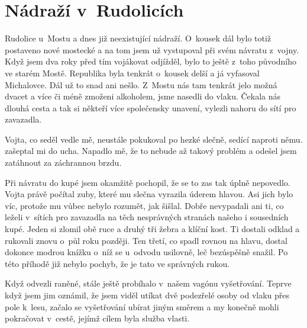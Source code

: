 
\chapter{Nádraží v~Rudolicích}

Rudolice u~Mostu a dnes již neexistující nádraží. O~kousek dál bylo totiž
postaveno nové mostecké a na tom jsem už vystupoval při svém návratu z~vojny.
Když jsem dva roky před tím vojákovat odjížděl, bylo to ještě z~toho původního
ve starém Mostě. Republika byla tenkrát o~kousek delší a já vyfasoval
Michalovce. Dál už to snad ani nešlo. Z~Mostu nás tam tenkrát jelo možná dvacet
a více či méně zmoženi alkoholem, jsme nasedli do vlaku. Čekala nás dlouhá
cesta a tak si někteří více společensky unavení, vylezli nahoru do sítí pro
zavazadla.

Vojta, co seděl vedle mě, neustále pokukoval po hezké slečně, sedící naproti
němu. 
zašeptal mi do ucha. Napadlo mě, že to nebude až takový problém a odešel jsem
zatáhnout za záchrannou brzdu.

Při návratu do kupé jsem okamžitě pochopil, že se to zas tak úplně nepovedlo.
Vojta právě počítal zuby, které mu slečna vyrazila úderem hlavou. Asi jich bylo
víc, protože mu vůbec nebylo rozumět, jak šišlal. Dobře nevypadali ani ti, co
leželi v~sítích pro zavazadla na těch nesprávných stranách našeho i sousedních
kupé. Jeden si zlomil obě ruce a druhý tři žebra a klíční kost. Ti dostali
odklad a rukovali znovu o~půl roku později. Ten třetí, co spadl rovnou na
hlavu, dostal dokonce modrou knížku o~níž se u~odvodu usilovně, leč bezúspěšně
snažil. Po této příhodě již nebylo pochyb, že je tato ve správných rukou.

Když odvezli raněné, stále ještě probíhalo v~našem vagónu vyšetřování. Teprve
když jsem jim oznámil, že jsem viděl utíkat dvě podezřelé osoby od vlaku přes
pole k~lesu, začalo se vyšetřování ubírat jiným směrem a my konečně mohli
pokračovat v~cestě, jejímž cílem byla služba vlasti.
